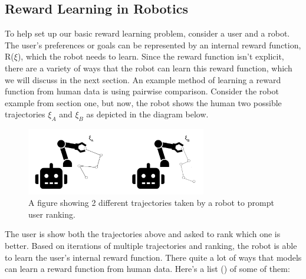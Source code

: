 \documentclass[
  letterpaper,
  DIV=11,
  numbers=noendperiod,
  oneside]{scrreprt}
\theoremstyle{remark}
\begin{document}
\subsection{Reward Learning in
Robotics}\label{reward-learning-in-robotics}

To help set up our basic reward learning problem, consider a user and a
robot. The user's preferences or goals can be represented by an internal
reward function, R(\(\xi\)), which the robot needs to learn. Since the
reward function isn't explicit, there are a variety of ways that the
robot can learn this reward function, which we will discuss in the next
section. An example method of learning a reward function from human data
is using pairwise comparison. Consider the robot example from section
one, but now, the robot shows the human two possible trajectories
\(\xi_A\) and \(\xi_B\) as depicted in the diagram below.

\begin{figure}

{\centering \includegraphics[width=0.7\textwidth,height=\textheight]{Figures/robots.png}

}

\caption{A figure showing 2 different trajectories taken by a robot to
prompt user ranking.}

\end{figure}%

The user is show both the trajectories above and asked to rank which one
is better. Based on iterations of multiple trajectories and ranking, the
robot is able to learn the user's internal reward function. There quite
a lot of ways that models can learn a reward function from human data.
Here's a list () of some
of them:
\end{document}
